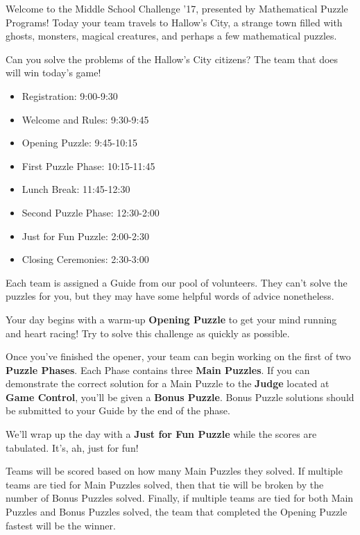 

Welcome to the Middle School Challenge '17, presented by Mathematical
Puzzle Programs! Today your team travels to Hallow's City, a strange town
filled with ghosts, monsters, magical creatures, and perhaps a few
mathematical puzzles.

Can you solve the problems of the Hallow's City citizens? The team that
does will win today's game!


\begin{itemize}
  \item Registration: 9:00-9:30
  \item Welcome and Rules: 9:30-9:45
  \item Opening Puzzle: 9:45-10:15
  \item First Puzzle Phase: 10:15-11:45
  \item Lunch Break: 11:45-12:30
  \item Second Puzzle Phase: 12:30-2:00
  \item Just for Fun Puzzle: 2:00-2:30
  \item Closing Ceremonies: 2:30-3:00
\end{itemize}


Each team is assigned a Guide from our pool of volunteers. They can't solve
the puzzles for you, but they may have some helpful words of advice nonetheless.


Your day begins with a warm-up \textbf{Opening Puzzle} to get your mind running
and heart racing! Try to solve this challenge as quickly as possible.

Once you've finished the opener, your team can begin working on the first of two
\textbf{Puzzle Phases}. Each Phase contains three \textbf{Main Puzzles}.
If you can demonstrate the correct solution for a Main Puzzle
to the \textbf{Judge} located
at \textbf{Game Control}, you'll be given a \textbf{Bonus Puzzle}.
Bonus Puzzle solutions should be submitted to your Guide by the end of
the phase.

We'll wrap up the day with a \textbf{Just for Fun Puzzle} while the scores
are tabulated. It's, ah, just for fun!


Teams will be scored based on how many Main Puzzles they solved.
If multiple teams are tied for Main Puzzles solved, then that tie will be broken
by the number of Bonus Puzzles solved. Finally, if multiple teams are tied
for both Main Puzzles and Bonus Puzzles solved, the team that completed the
Opening Puzzle fastest will be the winner.

